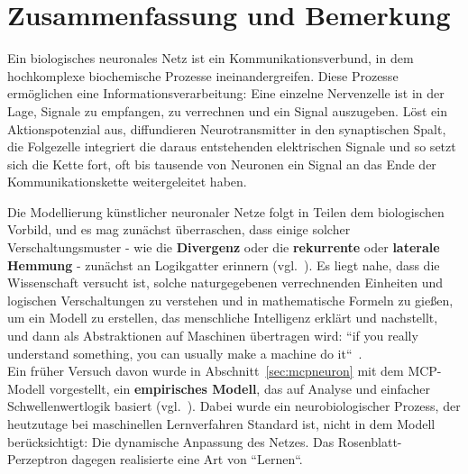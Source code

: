 \chapter{Zusammenfassung und Bemerkung}



Ein biologisches neuronales Netz ist ein Kommunikationsverbund, in dem hochkomplexe biochemische Prozesse ineinandergreifen.
Diese Prozesse ermöglichen eine Informationsverarbeitung: Eine einzelne Nervenzelle ist in der Lage, Signale zu empfangen, zu verrechnen und ein Signal auszugeben.
Löst ein Aktionspotenzial aus, diffundieren Neurotransmitter in den synaptischen Spalt, die Folgezelle integriert die daraus entstehenden elektrischen Signale und so setzt sich die Kette fort, oft bis tausende von Neuronen ein Signal an das Ende der Kommunikationskette weitergeleitet haben.

Die Modellierung künstlicher neuronaler Netze folgt in Teilen dem biologischen Vorbild, und es mag zunächst überraschen, dass einige solcher Verschaltungsmuster - wie die \textbf{Divergenz} oder die \textbf{rekurrente} oder \textbf{laterale Hemmung} - zunächst an Logikgatter erinnern (vgl.~\cite[58 f.]{Eil19}). Es liegt nahe, dass die Wissenschaft versucht ist, solche naturgegebenen verrechnenden Einheiten und logischen Verschaltungen zu verstehen und in mathematische Formeln zu gießen, um ein Modell zu erstellen, das menschliche Intelligenz erklärt und nachstellt, und dann als Abstraktionen auf Maschinen übertragen wird: ``if you really understand something, you can usually make a machine do it``~\cite[xiii]{AR88}.\\

Ein früher Versuch davon wurde in Abschnitt~\ref{sec:mcpneuron} mit dem MCP-Modell vorgestellt, ein \textbf{empirisches Modell}, das auf Analyse und einfacher Schwellenwertlogik basiert (vgl.~\cite[16]{AR88}). Dabei wurde ein neurobiologischer Prozess, der heutzutage bei maschinellen Lernverfahren Standard ist, nicht in dem Modell berücksichtigt: Die dynamische Anpassung des Netzes.
Das Rosenblatt-Perzeptron dagegen realisierte eine Art von ``Lernen``.

